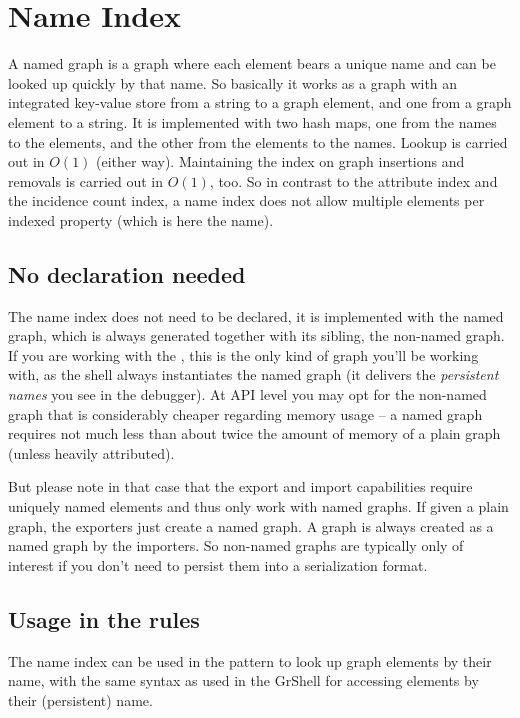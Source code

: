\section{Name Index}\label{sec:nameindex}
A named graph is a graph where each element bears a unique name and can be looked up quickly by that name.
So basically it works as a graph with an integrated key-value store from a string to a graph element, and one from a graph element to a string.
It is implemented with two hash maps, one from the names to the elements, and the other from the elements to the names.
Lookup is carried out in $O(1)$ (either way).
Maintaining the index on graph insertions and removals is carried out in $O(1)$, too.
So in contrast to the attribute index and the incidence count index, a name index does not allow multiple elements per indexed property (which is here the name).

\subsection*{No declaration needed}
The name index does not need to be declared, it is implemented with the named graph, which is always generated together with its sibling, the non-named graph.
If you are working with the \GrShell, this is the only kind of graph you'll be working with, as the shell always instantiates the named graph (it delivers the \emph{persistent names} you see in the debugger).
At API level you may opt for the non-named graph that is considerably cheaper regarding memory usage -- a named graph requires not much less than about twice the amount of memory of a plain graph (unless heavily attributed).

But please note in that case that the export and import capabilities require uniquely named elements and thus only work with named graphs.
If given a plain graph, the exporters just create a named graph.
A graph is always created as a named graph by the importers.
So non-named graphs are typically only of interest if you don't need to persist them into a serialization format.

\subsection*{Usage in the rules}
The name index can be used in the pattern to look up graph elements by their name, with the same syntax as used in the GrShell for accessing elements by their (persistent) name.


